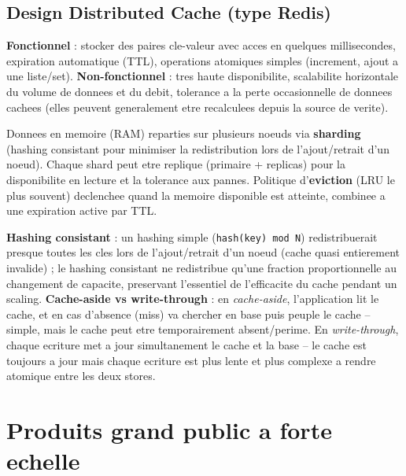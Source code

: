 \documentclass[11pt,a4paper]{article}
\newenvironment{sujet}[1]{%
  \subsection{#1}
}{%
  \bigskip
}
\begin{document}
\begin{sujet}{Design Distributed Cache (type Redis)}

\begin{req}
\textbf{Fonctionnel} : stocker des paires cle-valeur avec acces en quelques millisecondes, expiration automatique (TTL), operations atomiques simples (increment, ajout a une liste/set). \textbf{Non-fonctionnel} : tres haute disponibilite, scalabilite horizontale du volume de donnees et du debit, tolerance a la perte occasionnelle de donnees cachees (elles peuvent generalement etre recalculees depuis la source de verite).
\end{req}

\begin{archbox}
Donnees en memoire (RAM) reparties sur plusieurs noeuds via \textbf{sharding} (hashing consistant pour minimiser la redistribution lors de l'ajout/retrait d'un noeud). Chaque shard peut etre replique (primaire + replicas) pour la disponibilite en lecture et la tolerance aux pannes. Politique d'\textbf{eviction} (LRU le plus souvent) declenchee quand la memoire disponible est atteinte, combinee a une expiration active par TTL.
\end{archbox}

\begin{tradeoff}
\textbf{Hashing consistant} : un hashing simple (\texttt{hash(key) mod N}) redistribuerait presque toutes les cles lors de l'ajout/retrait d'un noeud (cache quasi entierement invalide) ; le hashing consistant ne redistribue qu'une fraction proportionnelle au changement de capacite, preservant l'essentiel de l'efficacite du cache pendant un scaling. \textbf{Cache-aside vs write-through} : en \emph{cache-aside}, l'application lit le cache, et en cas d'absence (miss) va chercher en base puis peuple le cache -- simple, mais le cache peut etre temporairement absent/perime. En \emph{write-through}, chaque ecriture met a jour simultanement le cache et la base -- le cache est toujours a jour mais chaque ecriture est plus lente et plus complexe a rendre atomique entre les deux stores.
\end{tradeoff}

\end{sujet}

\newpage
\section{Produits grand public a forte echelle}
\end{document}
